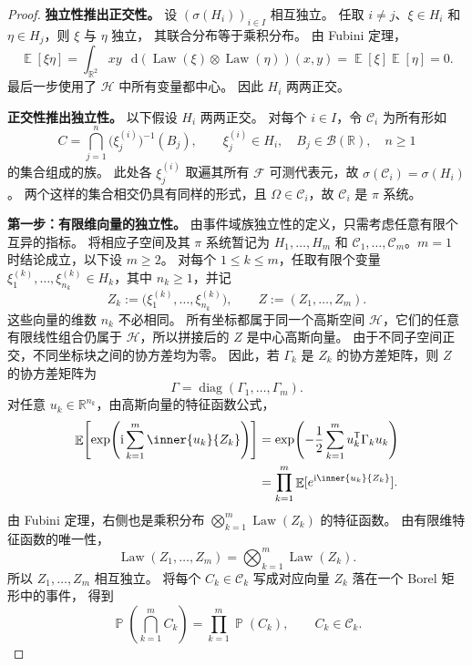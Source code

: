\documentclass[UTF8,11pt,a4paper,oneside,fontset=fandol]{ctexrep}
\numberwithin{equation}{section}
\theoremstyle{plain}
\theoremstyle{definition}
\theoremstyle{remark}
\newcommand{\R}{\mathbb{R}}
\newcommand{\B}{\mathcal{B}}
\newcommand{\F}{\mathcal{F}}
\newcommand{\Hcal}{\mathcal{H}}
\DeclareMathOperator{\Prob}{\mathbb{P}}
\DeclareMathOperator{\E}{\mathbb{E}}
\DeclareMathOperator{\Law}{Law}
\newcommand{\dd}{\mathop{}\!\mathrm{d}}
\begin{document}
\begin{proof}
\textbf{独立性推出正交性。}
设 $(\sigma(H_i))_{i\in I}$ 相互独立。
任取 $i\ne j$、$\xi\in H_i$ 和 $\eta\in H_j$，则 $\xi$ 与 $\eta$ 独立，
其联合分布等于乘积分布。
由 Fubini 定理，
\[
  \E[\xi\eta]
  =\int_{\R^2}xy\,\dd(\Law(\xi)\otimes\Law(\eta))(x,y)
  =\E[\xi]\E[\eta]=0.
\]
最后一步使用了 $\Hcal$ 中所有变量都中心。
因此 $H_i$ 两两正交。

\textbf{正交性推出独立性。}
以下假设 $H_i$ 两两正交。
对每个 $i\in I$，令 $\mathcal C_i$ 为所有形如
\[
  C=\bigcap_{j=1}^{n}\bigl(\xi_j^{(i)}\bigr)^{-1}(B_j),
  \qquad \xi_j^{(i)}\in H_i,\quad B_j\in\B(\R),\quad n\ge1
\]
的集合组成的族。
此处各 $\xi_j^{(i)}$ 取遍其所有 $\F$ 可测代表元，故 $\sigma(\mathcal C_i)=\sigma(H_i)$。
两个这样的集合相交仍具有同样的形式，且 $\Omega\in\mathcal C_i$，故 $\mathcal C_i$ 是 $\pi$ 系统。

\textbf{第一步：有限维向量的独立性。}
由事件域族独立性的定义，只需考虑任意有限个互异的指标。
将相应子空间及其 $\pi$ 系统暂记为 $H_1,\ldots,H_m$ 和
$\mathcal C_1,\ldots,\mathcal C_m$。$m=1$ 时结论成立，以下设 $m\ge2$。
对每个 $1\le k\le m$，任取有限个变量
$\xi_1^{(k)},\ldots,\xi_{n_k}^{(k)}\in H_k$，其中 $n_k\ge1$，并记
\[
  Z_k:=\bigl(\xi_1^{(k)},\ldots,\xi_{n_k}^{(k)}\bigr),
  \qquad Z:=(Z_1,\ldots,Z_m).
\]
这些向量的维数 $n_k$ 不必相同。
所有坐标都属于同一个高斯空间 $\Hcal$，它们的任意有限线性组合仍属于
$\Hcal$，所以拼接后的 $Z$ 是中心高斯向量。
由于不同子空间正交，不同坐标块之间的协方差均为零。
因此，若 $\Gamma_k$ 是 $Z_k$ 的协方差矩阵，则 $Z$ 的协方差矩阵为
\[
  \Gamma=\operatorname{diag}(\Gamma_1,\ldots,\Gamma_m).
\]
对任意 $u_k\in\R^{n_k}$，由高斯向量的特征函数公式，
\begin{align*}
  \E\!\left[
    \exp\!\left(\mathrm{i}\sum_{k=1}^{m}\inner{u_k}{Z_k}\right)
  \right]
  &=\exp\!\left(-\frac12\sum_{k=1}^{m}u_k^{\mathsf T}\Gamma_ku_k\right)\\
  &=\prod_{k=1}^{m}\E[e^{\mathrm{i}\inner{u_k}{Z_k}}].
\end{align*}
由 Fubini 定理，右侧也是乘积分布 $\bigotimes_{k=1}^{m}\Law(Z_k)$ 的特征函数。
由有限维特征函数的唯一性，
\[
  \Law(Z_1,\ldots,Z_m)=\bigotimes_{k=1}^{m}\Law(Z_k).
\]
所以 $Z_1,\ldots,Z_m$ 相互独立。
将每个 $C_k\in\mathcal C_k$ 写成对应向量 $Z_k$ 落在一个 Borel 矩形中的事件，
得到
\begin{equation}
  \label{eq:gaussian-subspace-cylinder-independence}
  \Prob\!\left(\bigcap_{k=1}^{m}C_k\right)
  =\prod_{k=1}^{m}\Prob(C_k),
  \qquad C_k\in\mathcal C_k.
\end{equation}


\end{proof}
\end{document}

